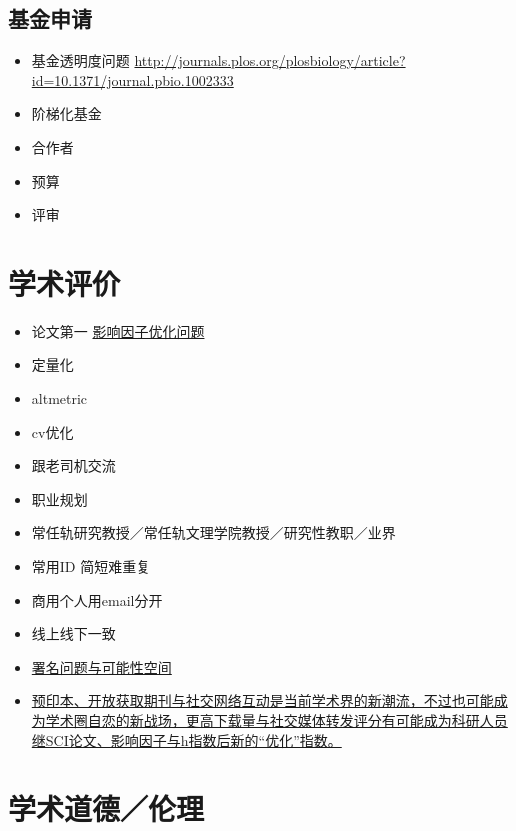 \documentclass[]{tufte-book}
\providecommand{\tightlist}{%
  \setlength{\itemsep}{0pt}\setlength{\parskip}{0pt}}
\begin{document}
\hypertarget{ux57faux91d1ux7533ux8bf7}{%
\subsection{基金申请}\label{ux57faux91d1ux7533ux8bf7}}

\begin{itemize}
\tightlist
\item
  基金透明度问题 \url{http://journals.plos.org/plosbiology/article?id=10.1371/journal.pbio.1002333}
\item
  阶梯化基金
\item
  合作者
\item
  预算
\item
  评审
\end{itemize}

\hypertarget{ux5b66ux672fux8bc4ux4ef7}{%
\section{学术评价}\label{ux5b66ux672fux8bc4ux4ef7}}

\begin{itemize}
\tightlist
\item
  论文第一 \href{https://onlinelibrary.wiley.com/doi/full/10.1111/eci.13151}{影响因子优化问题}
\item
  定量化
\item
  altmetric
\item
  cv优化
\item
  跟老司机交流
\item
  职业规划
\item
  常任轨研究教授／常任轨文理学院教授／研究性教职／业界
\item
  常用ID 简短难重复
\item
  商用个人用email分开
\item
  线上线下一致
\item
  \href{https://liorpachter.wordpress.com/2018/11/03/the-combinatorics-of-authorship-in-the-biological-sciences/}{署名问题与可能性空间}
\item
  \href{https://liorpachter.wordpress.com/2019/01/29/technologies-of-narcissism/}{预印本、开放获取期刊与社交网络互动是当前学术界的新潮流，不过也可能成为学术圈自恋的新战场，更高下载量与社交媒体转发评分有可能成为科研人员继SCI论文、影响因子与h指数后新的``优化''指数。}
\end{itemize}

\hypertarget{ux5b66ux672fux9053ux5fb7ux4f26ux7406}{%
\section{学术道德／伦理}\label{ux5b66ux672fux9053ux5fb7ux4f26ux7406}}
\end{document}
